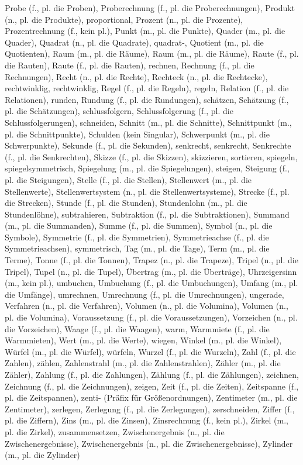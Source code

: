 Probe (f., pl. die Proben),
Proberechnung (f., pl. die Proberechnungen),
Produkt (n., pl. die Produkte),
proportional,
Prozent (n., pl. die Prozente),
Prozentrechnung (f., kein pl.),
Punkt (m., pl. die Punkte),
Quader (m., pl. die Quader),
Quadrat (n., pl. die Quadrate),
quadrat-,
Quotient (m., pl. die Quotienten),
Raum (m., pl. die Räume),
Raum (m., pl. die Räume),
Raute (f., pl. die Rauten),
Raute (f., pl. die Rauten),
rechnen,
Rechnung (f., pl. die Rechnungen),
Recht (n., pl. die Rechte),
Rechteck (n., pl. die Rechtecke),
rechtwinklig,
rechtwinklig,
Regel (f., pl. die Regeln),
regeln,
Relation (f., pl. die Relationen),
runden,
Rundung (f., pl. die Rundungen),
schätzen,
Schätzung (f., pl. die Schätzungen),
schlussfolgern,
Schlussfolgerung (f., pl. die Schlussfolgerungen),
schneiden,
Schnitt (m., pl. die Schnitte),
Schnittpunkt (m., pl. die Schnittpunkte),
Schulden (kein Singular),
Schwerpunkt (m., pl. die Schwerpunkte),
Sekunde (f., pl. die Sekunden),
senkrecht,
senkrecht,
Senkrechte (f., pl. die Senkrechten),
Skizze (f., pl. die Skizzen),
skizzieren,
sortieren,
spiegeln,
spiegelsymmetrisch,
Spiegelung (m., pl. die Spiegelungen),
steigen,
Steigung (f., pl. die Steigungen),
Stelle (f., pl. die Stellen),
Stellenwert (m., pl. die Stellenwerte),
Stellenwertsystem (n., pl. die Stellenwertsysteme),
Strecke (f., pl. die Strecken),
Stunde (f., pl. die Stunden),
Stundenlohn (m., pl. die Stundenlöhne),
subtrahieren,
Subtraktion (f., pl. die Subtraktionen),
Summand (m., pl. die Summanden),
Summe (f., pl. die Summen),
Symbol (n., pl. die Symbole),
Symmetrie (f., pl. die Symmetrien),
Symmetrieachse (f., pl. die Symmetrieachsen),
symmetrisch,
Tag (m., pl. die Tage),
Term (m., pl. die Terme),
Tonne (f., pl. die Tonnen),
Trapez (n., pl. die Trapeze),
Tripel (n., pl. die Tripel),
Tupel (n., pl. die Tupel),
Übertrag (m., pl. die Überträge),
Uhrzeigersinn (m., kein pl.),
umbuchen,
Umbuchung (f., pl. die Umbuchungen),
Umfang (m., pl. die Umfänge),
umrechnen,
Umrechnung (f., pl. die Umrechnungen),
ungerade,
Verfahren (n., pl. die Verfahren),
Volumen (n., pl. die Volumina),
Volumen (n., pl. die Volumina),
Voraussetzung (f., pl. die Voraussetzungen),
Vorzeichen (n., pl. die Vorzeichen),
Waage (f., pl. die Waagen),
warm,
Warmmiete (f., pl. die Warmmieten),
Wert (m., pl. die Werte),
wiegen,
Winkel (m., pl. die Winkel),
Würfel (m., pl. die Würfel),
würfeln,
Wurzel (f., pl. die Wurzeln),
Zahl (f., pl. die Zahlen),
zählen,
Zahlenstrahl (m., pl. die Zahlenstrahlen),
Zähler (m., pl. die Zähler),
Zahlung (f., pl. die Zahlungen),
Zählung (f., pl. die Zählungen),
zeichnen,
Zeichnung (f., pl. die Zeichnungen),
zeigen,
Zeit (f., pl. die Zeiten),
Zeitspanne (f., pl. die Zeitspannen),
zenti- (Präfix für Größenordnungen),
Zentimeter (m., pl. die Zentimeter),
zerlegen,
Zerlegung (f., pl. die Zerlegungen),
zerschneiden,
Ziffer (f., pl. die Ziffern),
Zins (m., pl. die Zinsen),
Zinsrechnung (f., kein pl.),
Zirkel (m., pl. die Zirkel),
zusammensetzen,
Zwischenergebnis (n., pl. die Zwischenergebnisse),
Zwischenergebnis (n., pl. die Zwischenergebnisse),
Zylinder (m., pl. die Zylinder) 